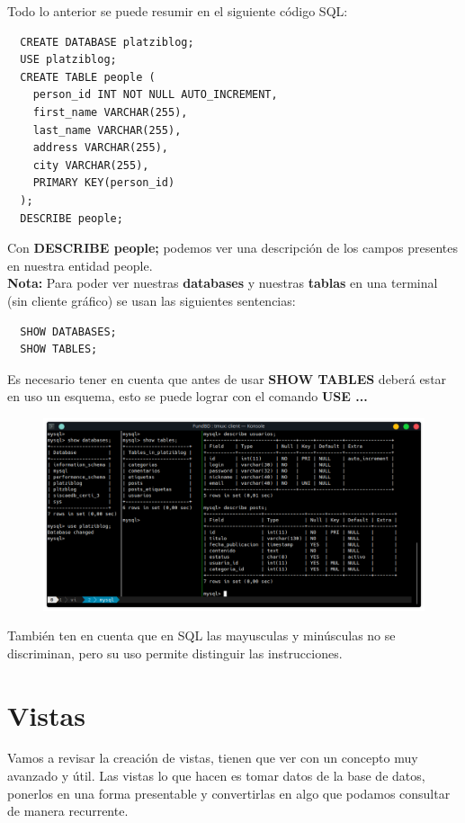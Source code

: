 \documentclass{article}
\begin{document}
Todo lo anterior se puede resumir en el siguiente código SQL:
\begin{verbatim}
  CREATE DATABASE platziblog;
  USE platziblog;
  CREATE TABLE people (
    person_id INT NOT NULL AUTO_INCREMENT,
    first_name VARCHAR(255),
    last_name VARCHAR(255),
    address VARCHAR(255),
    city VARCHAR(255),
    PRIMARY KEY(person_id)
  );
  DESCRIBE people;
\end{verbatim}

Con \textbf{DESCRIBE people;} podemos ver una descripción de los campos
presentes en nuestra entidad people.\\

\textbf{Nota:} Para poder ver nuestras \textbf{databases} y nuestras
\textbf{tablas} en una terminal (sin cliente gráfico) se usan las siguientes
sentencias:

\begin{verbatim}
  SHOW DATABASES;
  SHOW TABLES;
\end{verbatim}

Es necesario tener en cuenta que antes de usar \textbf{SHOW TABLES} deberá
estar en uso un esquema, esto se puede lograr con el comando \textbf{USE ...}

\begin{figure}[h!]
  \centering
  \includegraphics[scale=0.65]{./Pictures/143_ddl_create.png}
\end{figure}

\newpage
También ten en cuenta que en SQL las mayusculas y minúsculas no se discriminan,
pero su uso permite distinguir las instrucciones.

\newpage
\section{Vistas}%
Vamos a revisar la creación de vistas, tienen que ver con un concepto muy
avanzado y útil. Las vistas lo que hacen es tomar datos de la base de datos,
ponerlos en una forma presentable y convertirlas en algo que podamos consultar
de manera recurrente.\\
\end{document}
